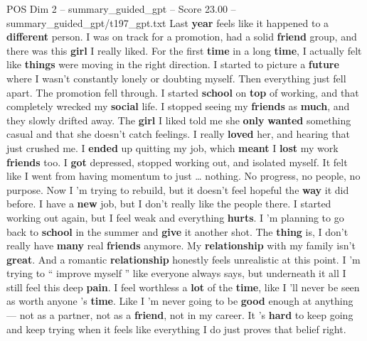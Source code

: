 \begin{textsample}{POS Dim 2 – summary\_guided\_gpt – Score 23.00 – summary\_guided\_gpt/t197\_gpt.txt}  \label{ex:f2_pos_009}
Last \textbf{year} feels like it happened to a \textbf{different} person.
I was on track for a promotion, had a solid \textbf{friend} group, and there was this \textbf{girl} I really liked.
For the first \textbf{time} in a long \textbf{time}, I actually felt like \textbf{things} were moving in the right direction.
I started to picture a \textbf{future} where I wasn't constantly lonely or doubting myself.
Then everything just fell apart.
The promotion fell through.
I started \textbf{school} on \textbf{top} of working, and that completely wrecked my \textbf{social} life.
I stopped seeing my \textbf{friends} as \textbf{much}, and they slowly drifted away.
The \textbf{girl} I liked told me she \textbf{only} \textbf{wanted} something casual and that she doesn't catch feelings.
I really \textbf{loved} her, and hearing that just crushed me.
I \textbf{ended} up quitting my job, which \textbf{meant} I \textbf{lost} my work \textbf{friends} too.
I \textbf{got} depressed, stopped working out, and isolated myself.
It felt like I went from having momentum to just … nothing.
No progress, no people, no purpose.
Now I ’m trying to rebuild, but it doesn't feel hopeful the \textbf{way} it did before.
I have a \textbf{new} job, but I don't really like the people there.
I started working out again, but I feel weak and everything \textbf{hurts}.
I ’m planning to go back to \textbf{school} in the summer and \textbf{give} it another shot.
The \textbf{thing} is, I don't really have \textbf{many} real \textbf{friends} anymore.
My \textbf{relationship} with my family isn't \textbf{great}.
And a romantic \textbf{relationship} honestly feels unrealistic at this point.
I ’m trying to “ improve myself ” like everyone always says, but underneath it all I still feel this deep \textbf{pain}.
I feel worthless a \textbf{lot} of the \textbf{time}, like I ’ll never be seen as worth anyone ’s \textbf{time}.
Like I ’m never going to be \textbf{good} enough at anything — not as a partner, not as a \textbf{friend}, not in my career.
It ’s \textbf{hard} to keep going and keep trying when it feels like everything I do just proves that belief right.

\end{textsample}
